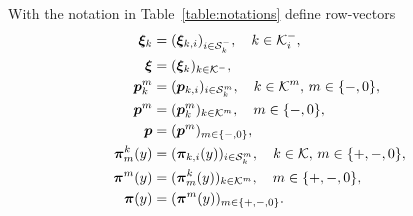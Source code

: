 %
 
With the notation in Table~\ref{table:notations} define row-vectors 
 \begin{align*}
	{\boldsymbol{\xi}}_k &= ( \boldsymbol\xi_{k,i})_{i\in\mathcal{S}_k^-}, \quad  {k\in\mathcal K_i^-},
	\\ {\boldsymbol{\xi}}& = ( \boldsymbol \xi_k)_{k\in\mathcal K^-},
	\\\boldsymbol{p}^{m}_k &= (  \boldsymbol p_{k,i})_{i\in\mathcal{S}_k^m}, \quad  k\in{\mathcal K^m},\, m\in\{-,0\},
	\\ {\boldsymbol{p}^m} &= (  \boldsymbol p^{m}_k)_{k\in\mathcal K^m},\quad m\in\{-,0\},
	\\ {\boldsymbol{p}} &= (  \boldsymbol p^m)_{m\in\{-,0\}},
	\\{\boldsymbol{\pi}}^{k}_m(y) &= (  \boldsymbol \pi_{k,i}(y))_{i\in\mathcal{S}_k^m},\quad  k\in\mathcal K,\,m\in\{+,-,0\},
	\\{\boldsymbol{\pi}}^m(y) &= (\boldsymbol \pi^{k}_m(y))_{k\in\mathcal K^m},\quad  m\in\{+,-,0\},
	\\ {\boldsymbol{\pi}}(y) &= (  \boldsymbol \pi^m(y))_{m\in\{+,-,0\}}.
 \end{align*}
 
